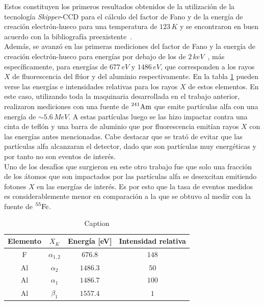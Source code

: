 Estos constituyen los primeros resultados obtenidos de la utilización de la tecnología \textit{Skipper}-CCD para el cálculo del factor de Fano y de la energía de creación electrón-hueco para una temperatura de $123\,\si{K}$ y se encontraron en buen acuerdo con la bibliografía preexistente~\cite{Ryan, Alig, Kotov}.\\
\indent Además, se avanzó en las primeras mediciones del factor de Fano y la energía de creación electrón-hueco para energías por debajo de los de $2\,\si{keV}$~\cite{TesisKevin}, más específicamente, para energías de $677\,\si{eV}$ y $1486\,\si{eV}$, que corresponden a los rayos $X$ de fluorescencia del flúor y del aluminio respectivamente. En la tabla \ref{tab:EnergiasFluorescenciaFAl} pueden verse las energías e intensidades relativas para los rayos $X$ de estos elementos. En este caso, utilizando toda la maquinaria desarrollada en el trabajo anterior, realizaron mediciones con una fuente de $\prescript{241}{}{\mbox{Am}}$ que emite partículas alfa con una energía de $\sim 5.6\,\si{MeV}$. A estas partículas luego se las hizo impactar contra una cinta de teflón y una barra de aluminio que por fluorescencia emitían rayos $X$ con las energías antes mencionadas. Cabe destacar que se trató de evitar que las partículas alfa alcanzaran el detector, dado que son partículas muy energéticas y por tanto no son eventos de interés.\\
\indent Uno de los desafíos que surgieron en este otro trabajo fue que solo una fracción de los átomos que son impactados por las partículas alfa se desexcitan emitiendo fotones $X$ en las energías de interés. Es por esto que la tasa de eventos medidos es considerablemente menor en comparación a la que se obtuvo al medir con la fuente de $\prescript{55}{}{\mbox{Fe}}$.
\begin{table}[h]
\centering
\begin{tabular}{@{}cccc@{}}
\toprule
Elemento    &   $X_{K}$         &   Energía [eV]    &   Intensidad relativa \\ \hline \hline
F           &   $\alpha_{1,2}$  &   $676.8$         &   $148$               \\
Al          &   $\alpha_{2}$    &   $1486.3$        &   $50$                \\
Al          &   $\alpha_{1}$    &   $1486.7$        &   $100$               \\
Al          &   $\beta_{1}$     &   $1557.4$        &   $1$                 \\ \bottomrule
\end{tabular}
\caption{\footnotesize{Caption}}
\label{tab:EnergiasFluorescenciaFAl}
\end{table}
